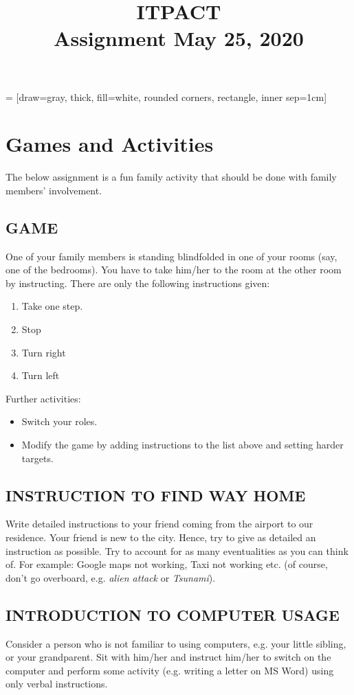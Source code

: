 \documentclass[addpoints,11pt]{exam}
\author{}
\title{ITPACT \\ Assignment May 25, 2020}
\date{}
\begin{document}
   = [draw=gray, thick, fill=white, rounded corners, rectangle, inner sep=1cm]
\maketitle

\pointsinrightmargin

\thispagestyle{head}

\section*{Games and Activities}
The below assignment is a fun family activity that should be done with family members' involvement.

\subsection*{GAME}
One of your family members is standing blindfolded in one of your rooms (say, one of the bedrooms). You have to take him/her to the room at the other room by instructing. There are only the following instructions given:
\begin{enumerate}
\item Take one step.
\item Stop
\item Turn right
\item Turn left
\end{enumerate}

Further activities:
\begin{itemize}
\item Switch your roles.
\item Modify the game by adding instructions to the list above and setting harder targets.
\end{itemize}

\subsection*{INSTRUCTION TO FIND WAY HOME}
Write detailed instructions to your friend coming from the airport to our residence. Your friend is new to the city. Hence, try to give as detailed an instruction as possible. Try to account for as many eventualities as you can think of. For example: Google maps not working, Taxi not working etc. (of course, don't go overboard, e.g. \emph{alien attack} or \emph{Tsunami}).

\subsection*{INTRODUCTION TO COMPUTER USAGE}
Consider a person who is not familiar to using computers, e.g. your little sibling, or your grandparent. Sit with him/her and instruct him/her to switch on the computer and perform some activity (e.g. writing a letter on MS Word) using only verbal instructions.
\end{document}
